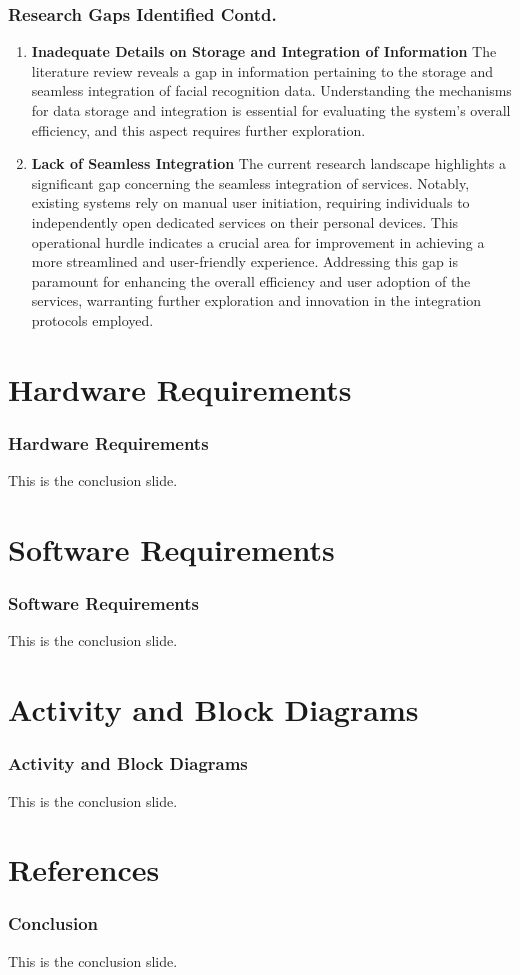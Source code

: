 \documentclass[aspectratio=169]{beamer}
\begin{document}
\begin{frame}
	\frametitle{Research Gaps Identified Contd.}
  \begin{minipage}{0.95\textwidth}
	\begin{enumerate}
		\item \textbf{Inadequate Details on Storage and Integration of Information}
		      The literature review reveals a gap in information pertaining to the storage and seamless integration of facial recognition data. Understanding the mechanisms for data storage and integration is essential for evaluating the system's overall efficiency, and this aspect requires further exploration.
		\item \textbf{Lack of Seamless Integration}
		      The current research landscape highlights a significant gap concerning the seamless integration of services. Notably, existing systems rely on manual user initiation, requiring individuals to independently open dedicated services on their personal devices. This operational hurdle indicates a crucial area for improvement in achieving a more streamlined and user-friendly experience. Addressing this gap is paramount for enhancing the overall efficiency and user adoption of the services, warranting further exploration and innovation in the integration protocols employed.
	\end{enumerate}
\end{minipage}
\end{frame}

\section{Hardware Requirements}
\begin{frame}
	\frametitle{Hardware Requirements}
	This is the conclusion slide.
\end{frame}

\section{Software Requirements}
\begin{frame}
	\frametitle{Software Requirements}
	This is the conclusion slide.
\end{frame}

\section{Activity and Block Diagrams}
\begin{frame}
	\frametitle{Activity and Block Diagrams}
	This is the conclusion slide.
\end{frame}

\section{References}
\begin{frame}
	\frametitle{Conclusion}
	This is the conclusion slide.
\end{frame}
\end{document}
